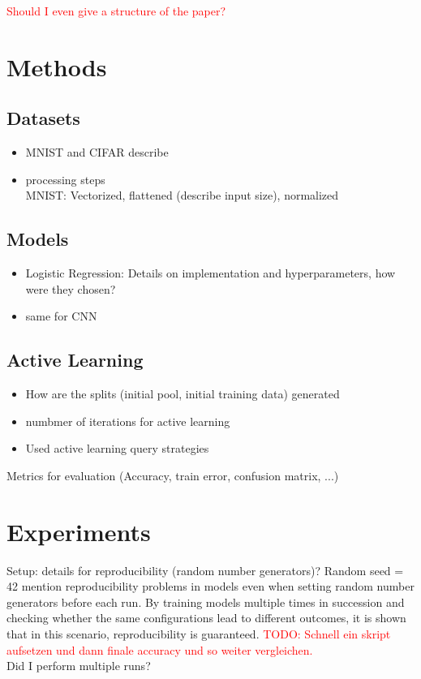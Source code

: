 \documentclass{article}
\theoremstyle{plain}
\theoremstyle{definition}
\theoremstyle{remark}
\begin{document}
\textcolor{red}{Should I even give a structure of the paper?}

\section{Methods}\label{sec:methods}
\label{data_and_methods}
\subsection{Datasets}
\begin{itemize}
	\item MNIST and CIFAR describe
	\item processing steps \\
	MNIST: Vectorized, flattened (describe input size), normalized
\end{itemize}

\subsection{Models}
\begin{itemize}
	\item Logistic Regression: Details on implementation and hyperparameters, how were they chosen?
	\item same for CNN
\end{itemize}

\subsection{Active Learning}
\begin{itemize}
	\item How are the splits (initial pool, initial training data) generated
	\item numbmer of iterations for active learning
	\item Used active learning query strategies
\end{itemize}

Metrics for evaluation (Accuracy, train error, confusion matrix, ...)

\section{Experiments}\label{sec:experiments}
Setup: details for reproducibility (random number generators)?
Random seed = 42
\cite{comparableactivelearning} mention reproducibility problems in models even when setting random number generators before each run. By training models multiple times in succession and checking whether the same configurations lead to different outcomes, it is shown that in this scenario, reproducibility is guaranteed. \textcolor{red}{TODO: Schnell ein skript aufsetzen und dann finale accuracy und so weiter vergleichen.}
\\
Did I perform multiple runs?
\\
\end{document}

